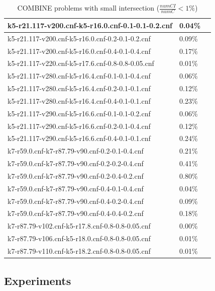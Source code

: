 \documentclass[12pt,a4paper,twoside]{scrartcl}
\numberwithin{equation}{section}
\begin{document}
\begin{table}[H]
\begin{center}
\begin{tabular}{|l|l|p{1cm}|}
 k5-r21.117-v200.cnf-k5-r16.0.cnf-0.1-0.1-0.2.cnf&	0.04\%	\\   \hline
 k5-r21.117-v200.cnf-k5-r16.0.cnf-0.2-0.1-0.2.cnf&	0.09\%	\\   \hline
 k5-r21.117-v200.cnf-k5-r16.0.cnf-0.4-0.1-0.4.cnf&	0.17\%	\\   \hline
 k5-r21.117-v220.cnf-k5-r17.6.cnf-0.8-0.8-0.05.cnf&	0.01\%	\\   \hline
 k5-r21.117-v280.cnf-k5-r16.4.cnf-0.1-0.1-0.4.cnf&	0.06\%	\\   \hline
 k5-r21.117-v280.cnf-k5-r16.4.cnf-0.2-0.1-0.1.cnf&	0.12\%	\\   \hline
 k5-r21.117-v280.cnf-k5-r16.4.cnf-0.4-0.1-0.1.cnf&	0.23\%	\\   \hline
 k5-r21.117-v290.cnf-k5-r16.6.cnf-0.1-0.1-0.2.cnf&	0.06\%	\\   \hline
 k5-r21.117-v290.cnf-k5-r16.6.cnf-0.2-0.1-0.4.cnf&	0.12\%	\\   \hline
 k5-r21.117-v290.cnf-k5-r16.6.cnf-0.4-0.1-0.1.cnf&	0.24\%	\\   \hline
 k7-r59.0.cnf-k7-r87.79-v90.cnf-0.2-0.1-0.4.cnf&	0.21\%	\\   \hline
 k7-r59.0.cnf-k7-r87.79-v90.cnf-0.2-0.2-0.4.cnf&	0.41\%	\\   \hline
 k7-r59.0.cnf-k7-r87.79-v90.cnf-0.2-0.4-0.2.cnf&	0.80\%	\\   \hline
 k7-r59.0.cnf-k7-r87.79-v90.cnf-0.4-0.1-0.4.cnf&	0.04\%	\\   \hline
 k7-r59.0.cnf-k7-r87.79-v90.cnf-0.4-0.2-0.4.cnf&	0.09\%	\\   \hline
 k7-r59.0.cnf-k7-r87.79-v90.cnf-0.4-0.4-0.2.cnf&	0.18\%	\\   \hline
 k7-r87.79-v102.cnf-k5-r17.8.cnf-0.8-0.8-0.05.cnf&	0.00\%	\\   \hline
 k7-r87.79-v106.cnf-k5-r18.0.cnf-0.8-0.8-0.05.cnf&	0.01\%	\\   \hline
 k7-r87.79-v110.cnf-k5-r18.2.cnf-0.8-0.8-0.05.cnf&	0.01\%	\\   \hline

\end{tabular}
\caption{COMBINE problems with small intersection ($\frac{numCI}{numC} < 1\%$)}
\end{center}
\end{table} 

\subsection{Experiments}
\end{document}
